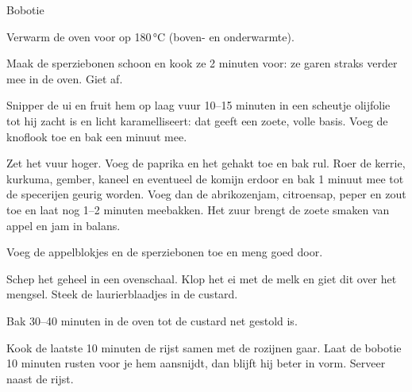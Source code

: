 \begin{recipe}{Bobotie}
\begin{steps}
  \item Verwarm de oven voor op 180\,°C (boven- en onderwarmte).
  \item Maak de sperziebonen schoon en kook ze 2 minuten voor: ze garen straks
        verder mee in de oven. Giet af.
  \item Snipper de ui en fruit hem op laag vuur 10--15 minuten in een scheutje
        olijfolie tot hij zacht is en licht karamelliseert: dat geeft een
        zoete, volle basis. Voeg de knoflook toe en bak een minuut mee.
  \item Zet het vuur hoger. Voeg de paprika en het gehakt toe en bak rul. Roer de kerrie, kurkuma,
        gember, kaneel en eventueel de komijn erdoor en bak 1 minuut mee tot de
        specerijen geurig worden. Voeg dan de abrikozenjam, citroensap, peper en
        zout toe en laat nog 1--2 minuten meebakken. Het zuur brengt de zoete
        smaken van appel en jam in balans.
  \item Voeg de appelblokjes en de sperziebonen toe en meng goed door.
  \item Schep het geheel in een ovenschaal. Klop het ei met de melk en giet dit
        over het mengsel. Steek de laurierblaadjes in de custard.
  \item Bak 30--40 minuten in de oven tot de custard net gestold is.
  \item Kook de laatste 10 minuten de rijst samen met de rozijnen gaar. Laat
        de bobotie 10 minuten rusten voor je hem aansnijdt, dan blijft hij
        beter in vorm. Serveer naast de rijst.
\end{steps}

\end{recipe}
